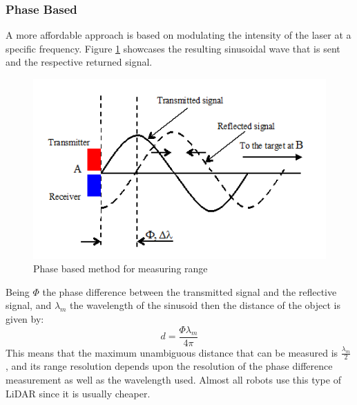 \subsubsection{Phase Based}
A more affordable approach  is based on modulating the intensity of the laser at a specific frequency. Figure \ref{fig:cwlidar1} showcases the resulting sinusoidal wave that is sent and the respective returned signal. 
\begin{figure}[ht!] 
\centerline{\includegraphics [width=0.7 \textwidth]{imgs/chapter2/cwlidar1.png}}
\caption[Phase based method for measuring range]{Phase based method for measuring range \cite{cwlidar}}
\label{fig:cwlidar1}
\end{figure}

Being $\Phi$ the phase difference between the transmitted signal and the reflective signal, and $\lambda_m$ the wavelength of the sinusoid then the distance of the object is given by:
\begin{equation}
    d=\frac{\Phi \lambda_m}{4 \pi}
\end{equation}
This means that the maximum unambiguous distance that can be measured is  $\frac{\lambda_m}{2}$, and its range resolution depends upon the resolution of the phase difference measurement as well as the wavelength used. Almost all robots use this type of \ac{LiDAR} since it is usually cheaper. 

